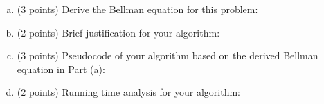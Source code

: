 \documentclass[12pt]{amsart}
\begin{document}
\medskip


\begin{enumerate}[(a)]
\item (3 points)
Derive the Bellman equation for this problem:



\vfill

\item (2 points)
Brief justification for your algorithm:


\vfill

\newpage
\item (3 points)
Pseudocode of your algorithm based on the derived Bellman equation in Part (a):

\vfill

\item (2 points)
Running time analysis for your algorithm:

\vfill

\end{enumerate}
\end{document}
